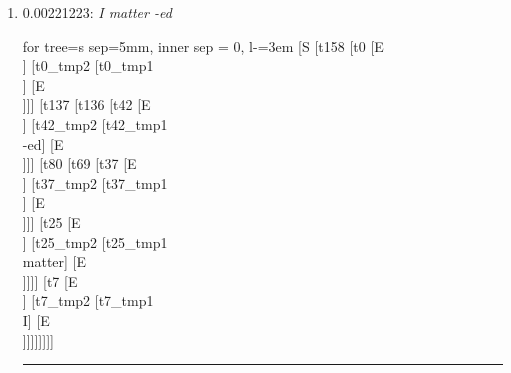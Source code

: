\documentclass[11pt]{article}
\begin{document}
\begin{enumerate}
	\item  0.00221223: \textit{I matter -ed} \\[0.5em]
	\begin{forest}
	for tree={s sep=5mm, inner sep = 0, l-=3em}
	[S [t158 [t0 [E\\ ] [t0_tmp2 [t0_tmp1\\ ] [E\\ ]]] [t137 [t136 [t42 [E\\ ] [t42_tmp2 [t42_tmp1\\-ed] [E\\ ]]] [t80 [t69 [t37 [E\\ ] [t37_tmp2 [t37_tmp1\\ ] [E\\ ]]] [t25 [E\\ ] [t25_tmp2 [t25_tmp1\\matter] [E\\ ]]]] [t7 [E\\ ] [t7_tmp2 [t7_tmp1\\I] [E\\ ]]]]]]]]
	\end{forest}
	\vspace{2\baselineskip}
	\hrule

\end{enumerate}
\end{document}

